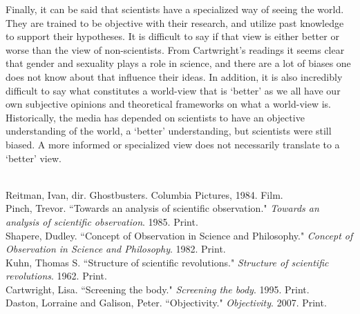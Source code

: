 \documentclass[11pt, oneside]{article}
\begin{document}
\par Finally, it can be said that scientists have a specialized way of seeing the world. They are trained to be objective with their research, and utilize past knowledge to support their hypotheses. It is difficult to say if that view is either better or worse than the view of non-scientists. From Cartwright's readings it seems clear that gender and sexuality plays a role in science, and there are a lot of biases one does not know about that influence their ideas. In addition, it is also incredibly difficult to say what constitutes a world-view that is `better' as we all have our own subjective opinions and theoretical frameworks on what a world-view is. Historically, the media has depended on scientists to have an objective understanding of the world, a `better' understanding, but scientists were still biased. A more informed or specialized view does not necessarily translate to a `better' view. 

\begin{workscited}
\bibent \\
\bibent Reitman, Ivan, dir. Ghostbusters. Columbia Pictures, 1984. Film. \\
\bibent Pinch, Trevor. ``Towards an analysis of scientific observation."  \textit{Towards an analysis of scientific observation}.  1985. Print. \\
\bibent Shapere, Dudley. ``Concept of Observation in Science and Philosophy."  \textit{Concept of Observation in Science and Philosophy}.  1982. Print. \\
\bibent Kuhn, Thomas S. ``Structure of scientific revolutions."  \textit{Structure of scientific revolutions}.  1962. Print. \\
\bibent Cartwright, Lisa. ``Screening the body."  \textit{Screening the body}.  1995. Print. \\
\bibent Daston, Lorraine and Galison, Peter. ``Objectivity."  \textit{Objectivity}.  2007. Print. \\
\end{workscited}
\end{document}
